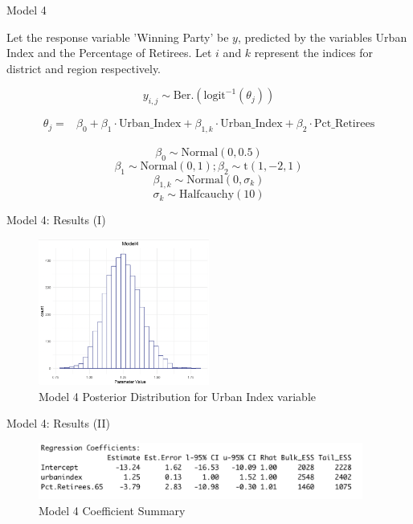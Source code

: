 \documentclass{beamer}
\begin{document}
\begin{frame}{Model 4}

    Let the response variable 'Winning Party' be \(y\), predicted by the variables Urban Index and the Percentage of Retirees. Let \(i\) and \(k\) represent the indices for district and region respectively.

    \[
    y_{i,j} \sim \text{Ber.}\left(\text{logit}^{-1}(\theta_{j})\right)
    \]

\[
\begin{aligned}
\theta_{j} =    &\beta_0 + \beta_1 \cdot \text{Urban\_Index} + \beta_{1,k} \cdot \text{Urban\_Index} + \beta_2 \cdot \text{Pct\_Retirees}
\end{aligned}
\]

    \[\beta_0 \sim \text{Normal}(0, 0.5)\]
    \[\beta_1 \sim \text{Normal}(0, 1); \beta_2 \sim \text{t}(1,-2,1)\]
    \[\beta_{1,k} \sim \text{Normal}(0, \sigma_k)\]
    \[ \sigma_k \sim \text{Halfcauchy}(10)\]
    
\end{frame}


\begin{frame}{Model 4: Results (I)}
    \begin{figure}
        \caption{Model 4 Posterior Distribution for Urban Index variable}
        \includegraphics[width=0.5\textwidth]{plots/model4_postui.png}
    \end{figure}

\end{frame}

\begin{frame}{Model 4: Results (II)}

    \begin{figure}
        \caption{Model 4 Coefficient Summary}
        \includegraphics[width=0.95\textwidth]{plots/model4_coeff.png}
    \end{figure}
\end{frame}
\end{document}
